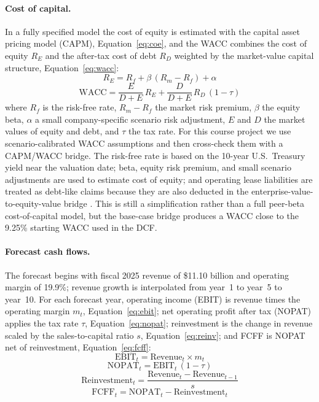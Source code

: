 \documentclass[a4paper]{CSMakotoTechnicalReport}
\begin{document}
\paragraph{Cost of capital.} In a fully specified model the cost of equity is estimated with the capital asset pricing model (CAPM), Equation~\eqref{eq:coe}, and the WACC combines the cost of equity $R_E$ and the after-tax cost of debt $R_D$ weighted by the market-value capital structure, Equation~\eqref{eq:wacc}:
\begin{equation}
R_E = R_f + \beta \,(R_m - R_f) + \alpha \label{eq:coe}
\end{equation}
\begin{equation}
\text{WACC} = \frac{E}{D+E}\,R_E + \frac{D}{D+E}\,R_D\,(1-\tau) \label{eq:wacc}
\end{equation}
where $R_f$ is the risk-free rate, $R_m - R_f$ the market risk premium, $\beta$ the equity beta, $\alpha$ a small company-specific scenario risk adjustment, $E$ and $D$ the market values of equity and debt, and $\tau$ the tax rate. For this course project we use scenario-calibrated WACC assumptions and then cross-check them with a CAPM/WACC bridge. The risk-free rate is based on the 10-year U.S.\ Treasury yield near the valuation date; beta, equity risk premium, and small scenario adjustments are used to estimate cost of equity; and operating lease liabilities are treated as debt-like claims because they are also deducted in the enterprise-value-to-equity-value bridge \autocite{fredDGS10,damodaranData}. This is still a simplification rather than a full peer-beta cost-of-capital model, but the base-case bridge produces a WACC close to the 9.25\% starting WACC used in the DCF.

\paragraph{Forecast cash flows.} The forecast begins with fiscal 2025 revenue of \$11.10 billion and operating margin of 19.9\%; revenue growth is interpolated from year~1 to year~5 to year~10. For each forecast year, operating income (EBIT) is revenue times the operating margin $m_t$, Equation~\eqref{eq:ebit}; net operating profit after tax (NOPAT) applies the tax rate $\tau$, Equation~\eqref{eq:nopat}; reinvestment is the change in revenue scaled by the sales-to-capital ratio $s$, Equation~\eqref{eq:reinv}; and FCFF is NOPAT net of reinvestment, Equation~\eqref{eq:fcff}:
\begin{equation}
\text{EBIT}_t = \text{Revenue}_t \times m_t \label{eq:ebit}
\end{equation}
\begin{equation}
\text{NOPAT}_t = \text{EBIT}_t \,(1-\tau) \label{eq:nopat}
\end{equation}
\begin{equation}
\text{Reinvestment}_t = \frac{\text{Revenue}_t - \text{Revenue}_{t-1}}{s} \label{eq:reinv}
\end{equation}
\begin{equation}
\text{FCFF}_t = \text{NOPAT}_t - \text{Reinvestment}_t \label{eq:fcff}
\end{equation}
\end{document}
